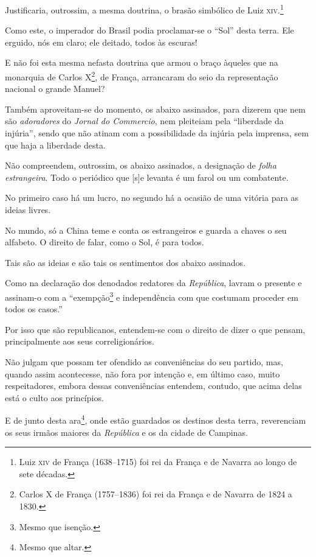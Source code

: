 Justificaria, outrossim, a mesma doutrina, o brasão simbólico de Luiz
\textsc{xiv}.\footnote{ Luiz \textsc{xiv} de França (1638--1715) foi rei da França e de
  Navarra ao longo de sete décadas.}

Como este, o imperador do Brasil podia proclamar-se o ``Sol'' desta terra.
Ele erguido, nós em claro; ele deitado, todos às escuras!

E não foi esta mesma nefasta doutrina que armou o braço àqueles que na
monarquia de Carlos X\footnote{ Carlos X de França (1757--1836) foi rei
  da França e de Navarra de 1824 a 1830.}, de França, arrancaram do seio
da representação nacional o grande Manuel?

\noindent\dotfill{}

Também aproveitam-se do momento, os abaixo assinados, para dizerem que
nem são \emph{adoradores} do \emph{Jornal do Commercio}, nem pleiteiam
pela ``liberdade da injúria'', sendo que não atinam com a possibilidade da
injúria pela imprensa, sem que haja a liberdade desta.

Não compreendem, outrossim, os abaixo assinados, a designação de
\emph{folha estrangeira}. Todo o periódico que {[}s{]}e levanta é um
farol ou um combatente.

No primeiro caso há um lucro, no segundo há a ocasião de uma vitória
para as ideias livres.

No mundo, só a China teme e conta os estrangeiros e guarda a chaves o
seu alfabeto. O direito de falar, como o Sol, é para todos.

\noindent\dotfill{}

Tais são as ideias e são tais os sentimentos dos abaixo assinados.

Como na declaração dos denodados redatores da \emph{República}, lavram o
presente e assinam-o com a ``exempção\footnote{ Mesmo que isenção.} e
independência com que costumam proceder em todos os casos.''

Por isso que são republicanos, entendem-se com o direito de dizer o que
pensam, principalmente aos seus correligionários.

Não julgam que possam ter ofendido as conveniências do seu partido, mas,
quando assim acontecesse, não fora por intenção e, em último caso, muito
respeitadores, embora dessas conveniências entendem, contudo, que acima
delas está o culto aos princípios.

E de junto desta ara\footnote{ Mesmo que altar.}, onde estão guardados
os destinos desta terra, reverenciam os seus irmãos maiores da
\emph{República} e os da cidade de Campinas.


